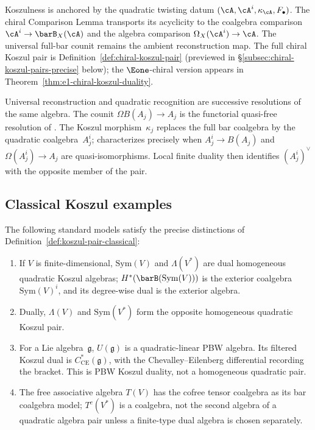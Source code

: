 \noindent
Koszulness is anchored by the quadratic twisting datum
$(\cA,\cA^i,\kappa_\cA,F_\bullet)$. The chiral Comparison Lemma
transports its acyclicity to the coalgebra comparison
$\cA^i\to\barB_X(\cA)$ and the algebra comparison
$\Omega_X(\cA^i)\to\cA$. The universal full-bar counit remains the
ambient reconstruction map.
The full chiral Koszul pair is
Definition~\ref{def:chiral-koszul-pair} (previewed in
\S\ref{subsec:chiral-koszul-pairs-precise} below);
the $\Eone$-chiral version appears in
Theorem~\ref{thm:e1-chiral-koszul-duality}.

\begin{remark}
\label{rem:two-phenomena}
Universal reconstruction and quadratic recognition are successive
resolutions of the same algebra. The counit
$\Omega B(A_j)\to A_j$ is the functorial quasi-free resolution of
\cite[Corollary~2.3.4]{LV12}. The Koszul morphism~$\kappa_j$
replaces the full bar coalgebra by the quadratic coalgebra~$A_j^i$;
\cite[Theorem~3.4.6]{LV12} characterizes precisely when
$A_j^i\to B(A_j)$ and $\Omega(A_j^i)\to A_j$ are
quasi-isomorphisms. Local finite duality then identifies
$(A_j^i)^\vee$ with the opposite member of the pair.
\end{remark}

\subsection{Classical Koszul examples}

\begin{theorem}
\label{thm:quadratic-koszul}
The following standard models satisfy the precise distinctions of
Definition~\ref{def:koszul-pair-classical}:
\begin{enumerate}
\item If $V$ is finite-dimensional, $\mathrm{Sym}(V)$ and
 $\Lambda(V^*)$ are dual homogeneous quadratic Koszul algebras;
 $H^*(\barB(\mathrm{Sym}(V)))$ is the exterior coalgebra
 $\mathrm{Sym}(V)^i$, and its degree-wise dual is the exterior
 algebra.
\item Dually, $\Lambda(V)$ and $\mathrm{Sym}(V^*)$ form the
 opposite homogeneous quadratic Koszul pair.
\item For a Lie algebra~$\mathfrak g$, $U(\mathfrak g)$ is a
 quadratic-linear PBW algebra. Its filtered Koszul dual is
 $C^*_{\mathrm{CE}}(\mathfrak g)$, with the Chevalley--Eilenberg
 differential recording the bracket. This is PBW Koszul duality,
 not a homogeneous quadratic pair.
\item The free associative algebra $T(V)$ has the cofree tensor
 coalgebra as its bar coalgebra model; $T^c(V^*)$ is a coalgebra,
 not the second algebra of a quadratic algebra pair unless a
 finite-type dual algebra is chosen separately.
\end{enumerate}
\end{theorem}

